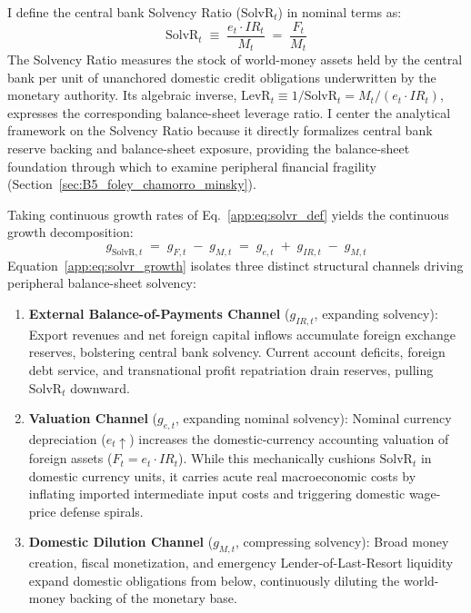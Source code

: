 I define the central bank Solvency Ratio ($\text{SolvR}_t$) in nominal terms as:
\begin{equation}
	\label{app:eq:solvr_def}
	\text{SolvR}_t \;\equiv\; \frac{e_t \cdot IR_t}{M_t} \;=\; \frac{F_t}{M_t}
\end{equation}
The Solvency Ratio measures the stock of world-money assets held by the central bank per unit of unanchored domestic credit obligations underwritten by the monetary authority. Its algebraic inverse, $\text{LevR}_t \equiv 1/\text{SolvR}_t = M_t / (e_t \cdot IR_t)$, expresses the corresponding balance-sheet leverage ratio. I center the analytical framework on the Solvency Ratio because it directly formalizes central bank reserve backing and balance-sheet exposure, providing the balance-sheet foundation through which to examine peripheral financial fragility \citep{Foley2003,Chamorro2025} (Section~\ref{sec:B5_foley_chamorro_minsky}).

Taking continuous growth rates of Eq.~\eqref{app:eq:solvr_def} yields the continuous growth decomposition:
\begin{equation}
	\label{app:eq:solvr_growth}
	g_{\text{SolvR},t} \;=\; g_{F,t} \;-\; g_{M,t} \;=\; g_{e,t} \;+\; g_{IR,t} \;-\; g_{M,t}
\end{equation}
Equation~\eqref{app:eq:solvr_growth} isolates three distinct structural channels driving peripheral balance-sheet solvency:
\begin{enumerate}[leftmargin=2em]
	\item \textbf{External Balance-of-Payments Channel} ($g_{IR,t}$, expanding solvency): Export revenues and net foreign capital inflows accumulate foreign exchange reserves, bolstering central bank solvency. Current account deficits, foreign debt service, and transnational profit repatriation drain reserves, pulling $\text{SolvR}_t$ downward.
	\item \textbf{Valuation Channel} ($g_{e,t}$, expanding nominal solvency): Nominal currency depreciation ($e_t \uparrow$) increases the domestic-currency accounting valuation of foreign assets ($F_t = e_t \cdot IR_t$). While this mechanically cushions $\text{SolvR}_t$ in domestic currency units, it carries acute real macroeconomic costs by inflating imported intermediate input costs and triggering domestic wage-price defense spirals.
	\item \textbf{Domestic Dilution Channel} ($g_{M,t}$, compressing solvency): Broad money creation, fiscal monetization, and emergency Lender-of-Last-Resort liquidity expand domestic obligations from below, continuously diluting the world-money backing of the monetary base.
\end{enumerate}

